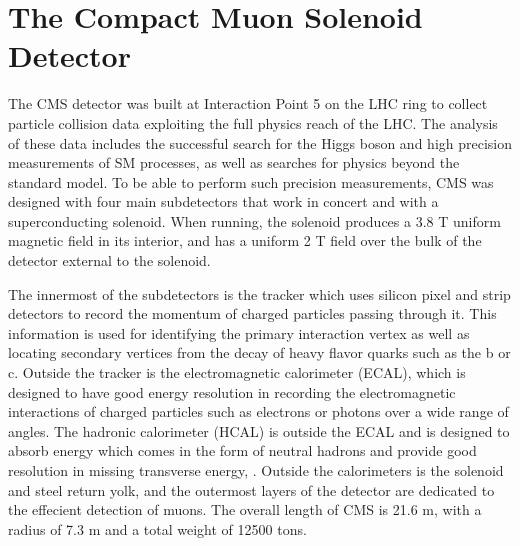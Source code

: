 \section{The Compact Muon Solenoid Detector}

The CMS detector was built
 at Interaction Point 5 on the LHC ring
 to collect particle collision data  exploiting the full physics reach
 of the LHC.
The analysis of these data includes
 the successful search for the Higgs boson
 and high precision measurements of SM processes,
 as well as searches for physics beyond the standard model.
To be able to perform such precision measurements,
 CMS was designed with four main subdetectors 
 that work in concert and with a superconducting solenoid.
When running, the solenoid produces a 3.8 T 
 uniform magnetic field in its interior,
 and has a uniform 2 T field 
 over the bulk of the detector external to the solenoid.

The innermost of the subdetectors is the tracker
 which uses silicon pixel and strip detectors 
 to record the momentum of charged particles 
 passing through it. 
This information is used for identifying
 the primary interaction vertex %
 as well as locating secondary vertices 
 from the decay of heavy flavor quarks
 such as the b or c.
Outside the tracker is the electromagnetic calorimeter (ECAL), 
 which is designed to have good energy resolution in recording
 the electromagnetic interactions of charged particles
 such as electrons or photons over a wide range of angles.
The hadronic calorimeter (HCAL) is outside the ECAL
 and is designed to absorb energy which
 comes in the form of neutral hadrons and provide 
 good resolution in missing transverse energy, \met.
Outside the calorimeters is the solenoid and steel return yolk,
 and the outermost layers of the detector are dedicated
 to the effecient detection of muons.
The overall length of CMS is 21.6 m, with a radius of 7.3 m
  and a total weight of 12500 tons.

